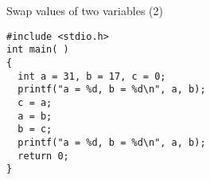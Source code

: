 \ifx\answer\undefined
\begin{frame}[fragile]{Swap values of two variables (2)}
\begin{lstlisting}[xleftmargin=0.05\linewidth, linewidth=0.85\linewidth]
#include <stdio.h>
int main( )
{
  int a = 31, b = 17, c = 0;
  printf("a = %d, b = %d\n", a, b);
  c = a; 
  a = b;
  b = c;
  printf("a = %d, b = %d\n", a, b);
  return 0;
}
\end{lstlisting}
\end{frame}
\fi


